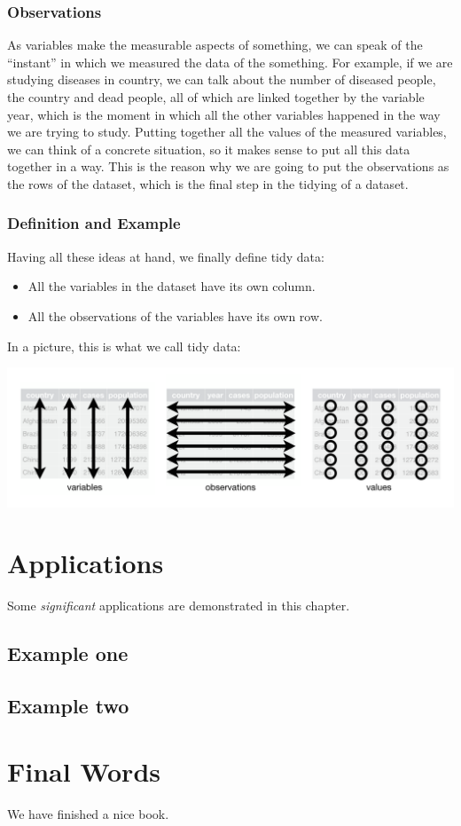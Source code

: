 \documentclass[]{book}
\begin{document}
\subsection{Observations}\label{observations}

As variables make the measurable aspects of something, we can speak of
the ``instant'' in which we measured the data of the something. For
example, if we are studying diseases in country, we can talk about the
number of diseased people, the country and dead people, all of which are
linked together by the variable year, which is the moment in which all
the other variables happened in the way we are trying to study. Putting
together all the values of the measured variables, we can think of a
concrete situation, so it makes sense to put all this data together in a
way. This is the reason why we are going to put the observations as the
rows of the dataset, which is the final step in the tidying of a
dataset.

\subsection{Definition and Example}\label{definition-and-example}

Having all these ideas at hand, we finally define tidy data:

\begin{itemize}
\item
  All the variables in the dataset have its own column.
\item
  All the observations of the variables have its own row.
\end{itemize}

In a picture, this is what we call tidy data:

\includegraphics[width=26.67in]{images/tidy-1}

\chapter{Applications}\label{applications}

Some \emph{significant} applications are demonstrated in this chapter.

\section{Example one}\label{example-one}

\section{Example two}\label{example-two}

\chapter{Final Words}\label{final-words}

We have finished a nice book.


\end{document}
